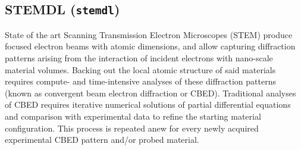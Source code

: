 \subsection{STEMDL ({\tt stemdl})}

State of the art Scanning Transmission Electron Microscopes (STEM)
produce focused electron beams with atomic dimensions, and allow 
capturing diffraction patterns arising from the interaction of incident
electrons with nano-scale material volumes. Backing out the local atomic
structure of said materials requires compute- and time-intensive
analyses of these diffraction patterns (known as convergent beam
electron diffraction or CBED). Traditional analyses of CBED requires
iterative numerical solutions of partial differential equations and
comparison with experimental data to refine the starting material
configuration. This process is repeated anew for every newly acquired
experimental CBED pattern and/or probed material.



